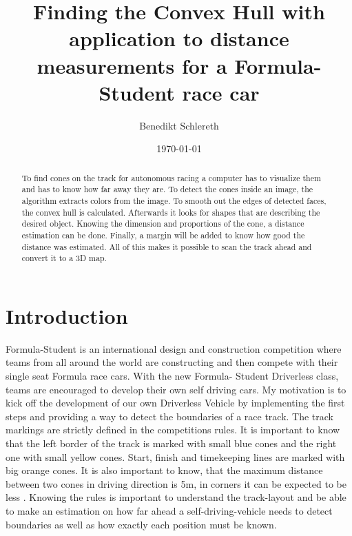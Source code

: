 \documentclass[10pt,a4paper]{article}
\title{Finding the Convex Hull with application to distance measurements for a Formula-Student race car}
\author{Benedikt Schlereth}
\date{\today}
\begin{document}
	\maketitle
	\tableofcontents
	\pagebreak
	
	\begin{abstract}
	To find cones on the track for autonomous racing a computer has to visualize them and has to know how far away they are.
	To detect the cones inside an image, the algorithm extracts colors from the image. To smooth out the edges of detected faces, the convex hull is calculated. Afterwards it looks for shapes that are describing the desired object. Knowing the dimension and proportions of the cone, a distance estimation can be done. Finally, a margin will be added to know how good the distance was estimated. All of this makes it possible to scan the track ahead and convert it to a 3D map.
	\end{abstract}
	
	\section{Introduction}
	Formula-Student is an international design and construction competition where teams from all around the world are constructing and then compete with their single seat Formula race cars. With the new Formula- Student Driverless class, teams are encouraged to develop their own self driving cars.
	My motivation is to kick off the development of our own Driverless Vehicle by implementing the first steps and providing a way to detect the boundaries of a race track.
	The track markings are strictly defined in the competitions rules. It is important to know that the left border of the track is marked with small blue cones and the right one with small yellow cones. 
	Start, finish and timekeeping lines are marked with big orange cones. It is also important to know, that the maximum distance between two cones in driving direction is 5m, in corners it can be expected to be less \cite{handbook}. Knowing the rules is important to understand the track-layout and be able to make an estimation on how far ahead a self-driving-vehicle needs to detect boundaries as well as how exactly each position must be known. 
	
\end{document}
